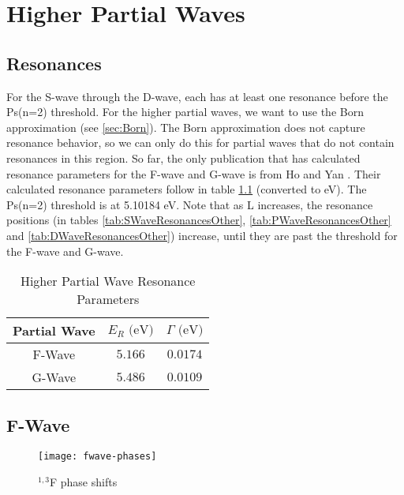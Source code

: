 \documentclass[Dissertation.tex]{subfiles}
\begin{document}
\clearpage
\pagebreak
\newpage

\chapter{Higher Partial Waves}
\label{chp:HigherWaves}


\section{Resonances}
For the S-wave through the D-wave, each has at least one resonance before the Ps(n=2) threshold. For the higher partial waves, we want to use the Born approximation (see \ref{sec:Born}). The Born approximation does not capture resonance behavior, so we can only do this for partial waves that do not contain resonances in this region. So far, the only publication that has calculated resonance parameters for the F-wave and G-wave is from Ho and Yan \cite{Ho2000}. Their calculated resonance parameters follow in table \ref{tab:HigherResonancesOther} (converted to eV). The Ps(n=2) threshold is at 5.10184 eV. Note that as L increases, the resonance positions (in tables \ref{tab:SWaveResonancesOther}, \ref{tab:PWaveResonancesOther} and \ref{tab:DWaveResonancesOther}) increase, until they are past the threshold for the F-wave and G-wave. 

\setlength{\abovecaptionskip}{6pt}
\setlength{\belowcaptionskip}{6pt}
\begin{table}[H]
\centering
\begin{tabular}{c c c}
\toprule
Partial Wave & $E_R \text{ (eV)}$ & $\Gamma \text{ (eV)}$ \\
\midrule
F-Wave & $5.166$ & $0.0174$ \\
G-Wave & $5.486$ & $0.0109$ \\
\bottomrule
\end{tabular}
\caption{Higher Partial Wave Resonance Parameters}
\label{tab:HigherResonancesOther}
\end{table}


\section{F-Wave}
\label{sec:FWave}

\begin{figure}[H]
	\centering
	\texttt{[image: fwave-phases]}
	\caption{$^{1,3}$F phase shifts}
	\label{fig:FWavePhase}
\end{figure}
\end{document}
